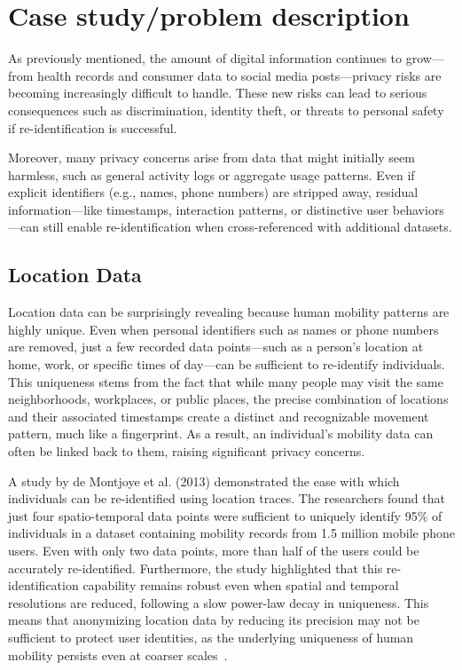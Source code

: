 \documentclass[twocolumn]{article}
\begin{document}
\section{Case study/problem description} \label{The Problem}

As previously mentioned, the amount of digital information continues to grow—from health records and consumer data to social media posts—privacy risks are becoming increasingly difficult to handle. These new risks can lead to serious consequences such as discrimination, identity theft, or threats to personal safety if re-identification is successful.  

Moreover, many privacy concerns arise from data that might initially seem harmless, such as general activity logs or aggregate usage patterns. Even if explicit identifiers (e.g., names, phone numbers) are stripped away, residual information—like timestamps, interaction patterns, or distinctive user behaviors—can still enable re-identification when cross-referenced with additional datasets.

\subsection{Location Data}

Location data can be surprisingly revealing because human mobility patterns are highly unique. Even when personal identifiers such as names or phone numbers are removed, just a few recorded data points—such as a person’s location at home, work, or specific times of day—can be sufficient to re-identify individuals. This uniqueness stems from the fact that while many people may visit the same neighborhoods, workplaces, or public places, the precise combination of locations and their associated timestamps create a distinct and recognizable movement pattern, much like a fingerprint. As a result, an individual’s mobility data can often be linked back to them, raising significant privacy concerns.

A study by de Montjoye et al. (2013) demonstrated the ease with which individuals can be re-identified using location traces. The researchers found that just four spatio-temporal data points were sufficient to uniquely identify 95\% of individuals in a dataset containing mobility records from 1.5 million mobile phone users. Even with only two data points, more than half of the users could be accurately re-identified. Furthermore, the study highlighted that this re-identification capability remains robust even when spatial and temporal resolutions are reduced, following a slow power-law decay in uniqueness. This means that anonymizing location data by reducing its precision may not be sufficient to protect user identities, as the underlying uniqueness of human mobility persists even at coarser scales~\cite{montjoye2013unique}.
\end{document}
